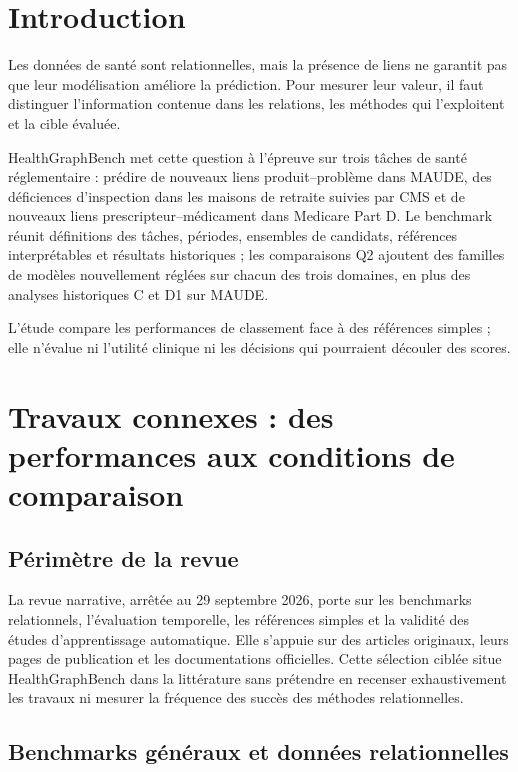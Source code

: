 \section{Introduction}

Les données de santé sont relationnelles, mais la présence de liens ne garantit pas que leur modélisation améliore la prédiction. Pour mesurer leur valeur, il faut distinguer l'information contenue dans les relations, les méthodes qui l'exploitent et la cible évaluée.

HealthGraphBench met cette question à l'épreuve sur trois tâches de santé réglementaire : prédire de nouveaux liens produit--problème dans MAUDE, des déficiences d'inspection dans les maisons de retraite suivies par CMS et de nouveaux liens prescripteur--médicament dans Medicare Part D. Le benchmark réunit définitions des tâches, périodes, ensembles de candidats, références interprétables et résultats historiques ; les comparaisons Q2 ajoutent des familles de modèles nouvellement réglées sur chacun des trois domaines, en plus des analyses historiques C et D1 sur MAUDE.

L'étude compare les performances de classement face à des références simples ; elle n'évalue ni l'utilité clinique ni les décisions qui pourraient découler des scores.

\section{Travaux connexes : des performances aux conditions de comparaison}

\subsection{Périmètre de la revue}

La revue narrative, arrêtée au 29 septembre 2026, porte sur les benchmarks relationnels, l'évaluation temporelle, les références simples et la validité des études d'apprentissage automatique. Elle s'appuie sur des articles originaux, leurs pages de publication et les documentations officielles. Cette sélection ciblée situe HealthGraphBench dans la littérature sans prétendre en recenser exhaustivement les travaux ni mesurer la fréquence des succès des méthodes relationnelles.

\subsection{Benchmarks généraux et données relationnelles}

